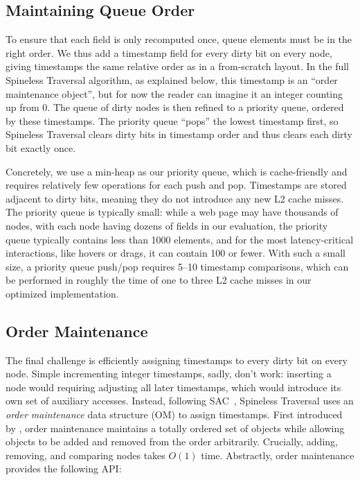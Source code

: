 \subsection{Maintaining Queue Order}

To ensure that each field is only recomputed once,
  queue elements must be in the right order.
We thus add a timestamp field
  for every dirty bit on every node,
  giving timestamps the same relative order
  as in a from-scratch layout.
In the full Spineless Traversal algorithm,
  as explained below,
  this timestamp is an ``order maintenance object'',
  but for now the reader can imagine it an integer counting up from 0.
The queue of dirty nodes is then refined to a priority queue,
  ordered by these timestamps.
The priority queue ``pops'' the lowest timestamp first,
  so Spineless Traversal clears dirty bits in timestamp order
  and thus clears each dirty bit exactly once.

Concretely, we use a min-heap as our priority queue,
  which is cache-friendly and requires
  relatively few operations for each push and pop.
Timestamps are stored adjacent to dirty bits,
  meaning they do not introduce any new L2 cache misses.
The priority queue is typically small:
  while a web page may have thousands of nodes,
  with each node having dozens of fields in our evaluation,
  the priority queue typically contains less than 1000 elements,
  and for the most latency-critical interactions,
  like hovers or drags, it can contain 100 or fewer.
With such a small size, a priority queue push/pop requires
  5--10 timestamp comparisons,
  which can be performed in roughly the time
  of one to three L2 cache misses
  in our optimized implementation.

\subsection{Order Maintenance}

The final challenge is efficiently assigning timestamps
  to every dirty bit on every node.
Simple incrementing integer timestamps, sadly, don't work:
  inserting a node would requiring adjusting all later timestamps,
  which would introduce its own set of auxiliary accesses.
Instead, following SAC~\cite{SAC},
  Spineless Traversal uses
  an \emph{order maintenance} data structure (OM)
  to assign timestamps.
First introduced by \citet{OM},
  order maintenance maintains a totally ordered set of objects
  while allowing objects
  to be added and removed from the order arbitrarily.
Crucially, adding, removing, and comparing nodes takes $O(1)$ time.
Abstractly, order maintenance provides the following API:

